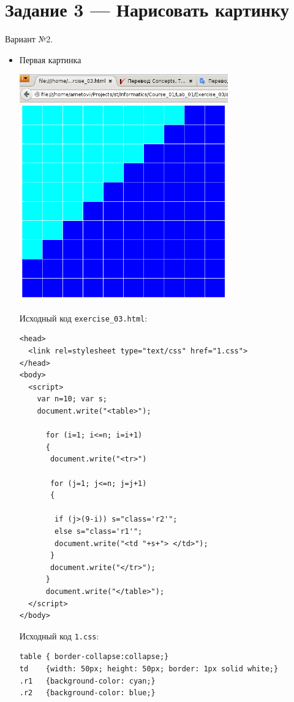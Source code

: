 \newpage
\section{Задание 3 --- Нарисовать картинку}

Вариант №2.

\begin{itemize}
\item{Первая картинка}

  \begin{center}
    \includegraphics[width=9cm]{img/exercise_03/a/01.png}
  \end{center}

  Исходный код \verb|exercise_03.html|:
\begin{verbatim}
<head>
  <link rel=stylesheet type="text/css" href="1.css">
</head>
<body>
  <script>
    var n=10; var s;
    document.write("<table>");

      for (i=1; i<=n; i=i+1)
      {
       document.write("<tr>")

       for (j=1; j<=n; j=j+1)
       {
     
        if (j>(9-i)) s="class='r2'";
        else s="class='r1'";
        document.write("<td "+s+"> </td>");
       }
       document.write("</tr>");
      }
      document.write("</table>");
  </script>
</body>
\end{verbatim}

Исходный код \verb|1.css|:

\begin{verbatim}
table { border-collapse:collapse;}
td    {width: 50px; height: 50px; border: 1px solid white;}
.r1   {background-color: cyan;}
.r2   {background-color: blue;}
\end{verbatim}


\end{itemize}
